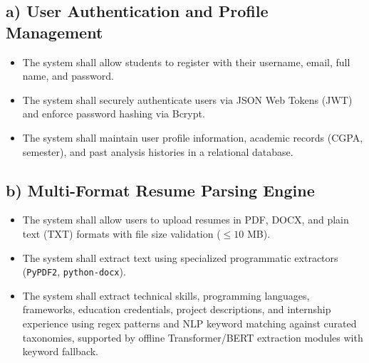 \documentclass[12pt,a4paper]{report}
\begin{document}
\subsection*{a) User Authentication and Profile Management}
\begin{itemize}
    \item The system shall allow students to register with their username, email, full name, and password.
    \item The system shall securely authenticate users via JSON Web Tokens (JWT) and enforce password hashing via Bcrypt.
    \item The system shall maintain user profile information, academic records (CGPA, semester), and past analysis histories in a relational database.
\end{itemize}

\subsection*{b) Multi-Format Resume Parsing Engine}
\begin{itemize}
    \item The system shall allow users to upload resumes in PDF, DOCX, and plain text (TXT) formats with file size validation ($\le 10$ MB).
    \item The system shall extract text using specialized programmatic extractors (\texttt{PyPDF2}, \texttt{python-docx}).
    \item The system shall extract technical skills, programming languages, frameworks, education credentials, project descriptions, and internship experience using regex patterns and NLP keyword matching against curated taxonomies, supported by offline Transformer/BERT extraction modules with keyword fallback.
\end{itemize}
\end{document}
